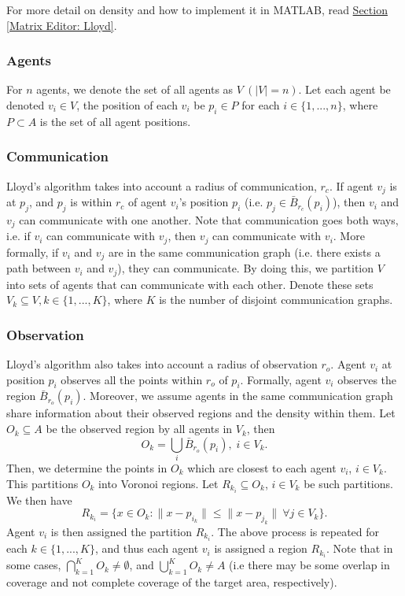 \documentclass[../CourseManual.tex]{subfiles}
\begin{document}
For more detail on density and how to implement it in MATLAB, read \hyperref[Matrix Editor: Lloyd]{Section \ref{Matrix Editor: Lloyd}}. 

\subsubsection{Agents} \label{Lloyd Agents}
For $n$ agents, we denote the set of all agents as $V \:(|V | = n)$. Let each agent be denoted $v_i \in V$, the position of each $v_i$ be $p_i \in P$ for each $i \in \{1, . . . , n\}$, where $P \subset A$ is the set of all agent positions.

\subsubsection{Communication} \label{Lloyd Communication}
Lloyd's algorithm takes into account a radius of communication, $r_c$. If agent $v_j$ is at $p_j$, and $p_j$ is within $r_c$ of agent $v_i$'s position $p_i$ (i.e. $p_j \in \bar{B}_{r_c}(p_i)$), then $v_i$ and $v_j$ can communicate with one another. Note that communication goes both ways, i.e. if $v_i$ can communicate with $v_j$, then $v_j$ can communicate with $v_i$. More formally, if $v_i$ and $v_j$ are in the same communication graph (i.e. there exists a path between $v_i$ and $v_j$), they can communicate. By doing this, we partition $V$ into sets of agents that can communicate with each other. Denote these sets $V_k \subseteq V, k \in \{1, . . . , K\}$, where $K$ is the number of disjoint communication graphs. 

\subsubsection{Observation} \label{Lloyd Observation}
Lloyd's algorithm also takes into account a radius of observation $r_o$. Agent $v_i$ at position $p_i$ observes all the points within $r_o$ of $p_i$. Formally, agent $v_i$ observes the region $\bar{B}_{r_o}(p_i)$. Moreover, we assume agents in the same communication graph share information about their observed regions and the density within them. Let $O_k \subseteq A$ be the observed region by all agents in $V_k$, then  
\[O_k = \bigcup_{i} \bar{B}_{r_o}(p_i),\; i \in V_k.\]
Then, we determine the points in $O_k$ which are closest to each agent $v_i$, $i \in V_k$. This partitions $O_k$ into Voronoi regions. Let $R_{k_i} \subseteq O_k$, $i \in V_k$ be such partitions. We then have
\[R_{k_i} = \{x \in O_k : \| x - p_{i_k} \| \leq \| x - p_{j_k} \| \ \forall j \in V_k\}.\]
Agent $v_i$ is then assigned the partition $R_{k_i}$. The above process is repeated for each $k \in \{1, . . . , K\}$, and thus each agent $v_i$ is assigned a region $R_{k_i}$. Note that in some cases, $\bigcap_{k=1}^K O_k \neq \emptyset$, and $\bigcup_{k=1}^K O_k \neq A$ (i.e there may be some overlap in coverage and not complete coverage of the target area, respectively).
\end{document}
